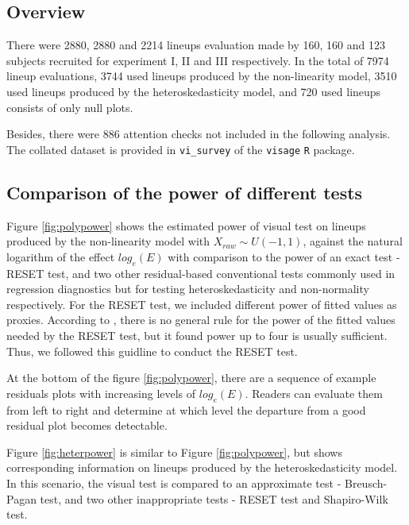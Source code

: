 \documentclass[]{interact}
\theoremstyle{plain}%
\theoremstyle{definition}
\theoremstyle{remark}
\begin{document}
\hypertarget{overview}{%
\subsection{Overview}\label{overview}}

There were 2880, 2880 and 2214 lineups evaluation made by 160, 160 and
123 subjects recruited for experiment I, II and III respectively. In the
total of 7974 lineup evaluations, 3744 used lineups produced by the
non-linearity model, 3510 used lineups produced by the
heteroskedasticity model, and 720 used lineups consists of only null
plots.

Besides, there were 886 attention checks not included in the following
analysis. The collated dataset is provided in \texttt{vi\_survey} of the
\texttt{visage} \texttt{R} package.

\hypertarget{comparison-of-the-power-of-different-tests}{%
\subsection{Comparison of the power of different
tests}\label{comparison-of-the-power-of-different-tests}}

Figure \ref{fig:polypower} shows the estimated power of visual test on
lineups produced by the non-linearity model with
\(X_{raw} \sim U(-1,1)\), against the natural logarithm of the effect
\(log_e(E)\) with comparison to the power of an exact test - RESET test,
and two other residual-based conventional tests commonly used in
regression diagnostics but for testing heteroskedasticity and
non-normality respectively. For the RESET test, we included different
power of fitted values as proxies. According to
\citep{ramsey_tests_1969}, there is no general rule for the power of the
fitted values needed by the RESET test, but it found power up to four is
usually sufficient. Thus, we followed this guidline to conduct the RESET
test.

At the bottom of the figure \ref{fig:polypower}, there are a sequence of
example residuals plots with increasing levels of \(log_e(E)\). Readers
can evaluate them from left to right and determine at which level the
departure from a good residual plot becomes detectable.

Figure \ref{fig:heterpower} is similar to Figure \ref{fig:polypower},
but shows corresponding information on lineups produced by the
heteroskedasticity model. In this scenario, the visual test is compared
to an approximate test - Breusch-Pagan test, and two other inappropriate
tests - RESET test and Shapiro-Wilk test.
\end{document}
